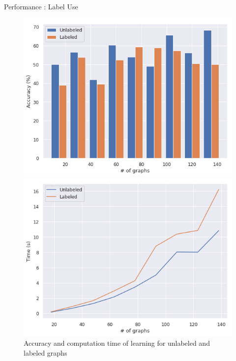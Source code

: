 \documentclass[compress]{beamer}
\begin{document}
\begin{frame}{Performance : Label Use}
\begin{figure}[!htb]
	\begin{multicols}{2}
		\includegraphics[width=\linewidth]{data/lab_nolab/acc.png}\par
		\includegraphics[width=\linewidth]{data/lab_nolab/time.png}\par
	\end{multicols}
	\caption {Accuracy and computation time of learning for unlabeled and labeled graphs}
\end{figure}
\end{frame}
\end{document}
